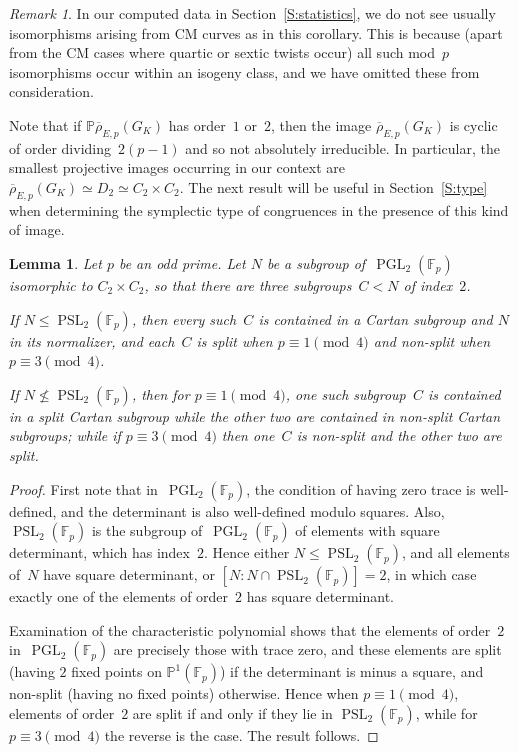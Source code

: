 \documentclass[12pt, reqno]{amsart}
\newcommand{\F}{\mathbb{F}}
\newcommand{\PP}{\mathbb{P}}
\newcommand{\rhobar}{{\overline{\rho}}}
\newcommand{\PGL}{\operatorname{PGL}}
\newcommand{\PSL}{\operatorname{PSL}}
\numberwithin{equation}{section}
\newtheorem{lemma}[theorem]{Lemma}
\theoremstyle{definition}
\theoremstyle{remark}
\newtheorem{remark}[theorem]{Remark}
\begin{document}
\begin{remark}
In our computed data in Section~\ref{S:statistics}, we do not see
usually isomorphisms arising from CM curves as in this corollary. This
is because (apart from the CM cases where quartic or sextic twists
occur) all such mod~$p$ isomorphisms occur within an isogeny class,
and we have omitted these from consideration.
\end{remark}



Note that if $\PP\rhobar_{E,p} (G_K)$ has order~$1$ or~$2$, then the image
$\rhobar_{E,p} (G_K)$ is cyclic of order dividing~$2(p-1)$ and so not absolutely irreducible. In particular, the smallest projective images occurring in our context 
are $\rhobar_{E,p} (G_K) \simeq D_2 \simeq C_2 \times C_2$. The next result will be useful in Section~\ref{S:type} when determining the symplectic type of congruences in the presence of this kind of image.

\begin{lemma}\label{L:C2xC2}
Let $p$ be an odd prime.  Let $N$ be a subgroup of~$\PGL_2(\F_p)$
isomorphic to $C_2\times C_2$, so that there are three subgroups~$C< N$
of index~$2$.

If $N\le\PSL_2(\F_p)$, then every such~$C$ is contained in a Cartan
subgroup and $N$ in its normalizer, and each~$C$ is split when
$p\equiv1\pmod4$ and non-split when $p\equiv3\pmod4$.

If $N\not\le\PSL_2(\F_p)$, then for $p\equiv1\pmod4$, one such
subgroup~$C$ is contained in a split Cartan subgroup while the other
two are contained in non-split Cartan subgroups; while if
$p\equiv3\pmod4$ then one~$C$ is non-split and the other two are
split.
\end{lemma}

\begin{proof}
  First note that in~$\PGL_2(\F_p)$, the condition of having zero
  trace is well-defined, and the determinant is also well-defined
  modulo squares.  Also, $\PSL_2(\F_p)$ is the subgroup of~$\PGL_2(\F_p)$ of elements with
  square determinant, which has index~$2$.  Hence either
  $N\le\PSL_2(\F_p)$, and all elements of~$N$ have square determinant,
  or $[N:N\cap\PSL_2(\F_p)]=2$, in which case exactly one of the
  elements of order~$2$ has square determinant.

  Examination of the characteristic polynomial shows that the elements
  of order~$2$ in~$\PGL_2(\F_p)$ are precisely those with trace zero,
  and these elements are split (having $2$ fixed points on
  $\PP^1(\F_p)$) if the determinant is minus a square, and non-split
  (having no fixed points) otherwise.  Hence when $p\equiv1\pmod4$,
  elements of order~$2$ are split if and only if they lie in
  $\PSL_2(\F_p)$, while for $p\equiv3\pmod4$ the reverse is the case.
  The result follows.
\end{proof}
\end{document}
